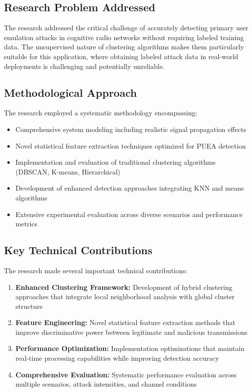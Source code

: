 \subsection{Research Problem Addressed}
The research addressed the critical challenge of accurately detecting primary user emulation attacks in cognitive radio networks without requiring labeled training data. The unsupervised nature of clustering algorithms makes them particularly suitable for this application, where obtaining labeled attack data in real-world deployments is challenging and potentially unreliable.

\subsection{Methodological Approach}
The research employed a systematic methodology encompassing:
\begin{itemize}
\item Comprehensive system modeling including realistic signal propagation effects
\item Novel statistical feature extraction techniques optimized for PUEA detection
\item Implementation and evaluation of traditional clustering algorithms (DBSCAN, K-means, Hierarchical)
\item Development of enhanced detection approaches integrating KNN and means algorithms
\item Extensive experimental evaluation across diverse scenarios and performance metrics
\end{itemize}

\subsection{Key Technical Contributions}
The research made several important technical contributions:
\begin{enumerate}
\item \textbf{Enhanced Clustering Framework:} Development of hybrid clustering approaches that integrate local neighborhood analysis with global cluster structure
\item \textbf{Feature Engineering:} Novel statistical feature extraction methods that improve discriminative power between legitimate and malicious transmissions
\item \textbf{Performance Optimization:} Implementation optimizations that maintain real-time processing capabilities while improving detection accuracy
\item \textbf{Comprehensive Evaluation:} Systematic performance evaluation across multiple scenarios, attack intensities, and channel conditions
\end{enumerate}

